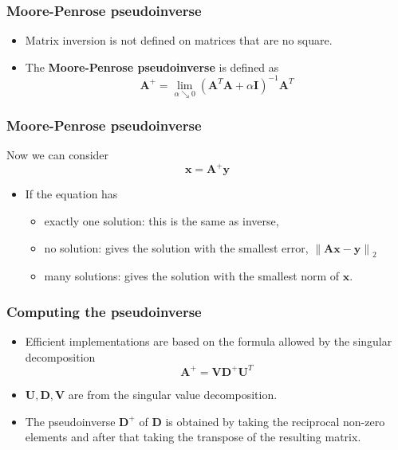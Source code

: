 \documentclass[notes]{beamer}          %
\newcommand{\vect}[1]{\bm{#1}}
\newcommand{\norm}[1]{\left\lVert#1\right\rVert}
\providecommand{\norm}[1]{\lVert#1\rVert}
\begin{document}
\begin{frame}
\frametitle{Moore-Penrose pseudoinverse}
    \begin{itemize}
        \item Matrix inversion is not defined on matrices that are no square.
        \item The {\bf Moore-Penrose pseudoinverse} is defined as
        $$
        \vect{A}^{+} = \lim_{\alpha \searrow 0}(\vect{A}^T\vect{A}+\alpha \vect{I})^{-1}\vect{A}^T
        $$

    \end{itemize}
\end{frame}

\begin{frame}
\frametitle{Moore-Penrose pseudoinverse}
    Now we can consider
    $$\vect{x} = \vect{A}^{+} \vect{y}$$
    \begin{itemize}
        \item If the equation has
            \begin{itemize}
                \item exactly one solution: this is the same as inverse,
                \item no solution: gives the solution with the smallest error, $\norm{\vect{A}\vect{x} - \vect{y}}_2$
                \item many solutions: gives the solution with the smallest norm of $\vect{x}$.
            \end{itemize}
    \end{itemize}

\end{frame}

\begin{frame}
\frametitle{Computing the pseudoinverse}
    \begin{itemize}
        \item Efficient implementations are based on the formula allowed by the singular decomposition
        $$
        \vect{A}^{+} = \vect{V}\vect{D}^{+}\vect{U}^T
        $$
        \item $\vect{U},\vect{D},\vect{V}$ are from the singular value decomposition.
        \item The pseudoinverse $\vect{D}^{+}$ of $\vect{D}$ is obtained by taking the reciprocal non-zero elements and after that taking the transpose of the resulting matrix.
    \end{itemize}

\end{frame}
\end{document}
